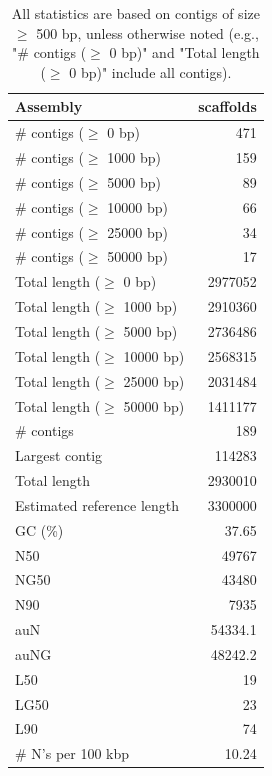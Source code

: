\documentclass[12pt,a4paper]{article}
\begin{document}
\begin{table}[ht]
\begin{center}
\caption{All statistics are based on contigs of size $\geq$ 500 bp, unless otherwise noted (e.g., "\# contigs ($\geq$ 0 bp)" and "Total length ($\geq$ 0 bp)" include all contigs).}
\begin{tabular}{|l*{1}{|r}|}
\hline
Assembly & scaffolds \\ \hline
\# contigs ($\geq$ 0 bp) & 471 \\ \hline
\# contigs ($\geq$ 1000 bp) & 159 \\ \hline
\# contigs ($\geq$ 5000 bp) & 89 \\ \hline
\# contigs ($\geq$ 10000 bp) & 66 \\ \hline
\# contigs ($\geq$ 25000 bp) & 34 \\ \hline
\# contigs ($\geq$ 50000 bp) & 17 \\ \hline
Total length ($\geq$ 0 bp) & 2977052 \\ \hline
Total length ($\geq$ 1000 bp) & 2910360 \\ \hline
Total length ($\geq$ 5000 bp) & 2736486 \\ \hline
Total length ($\geq$ 10000 bp) & 2568315 \\ \hline
Total length ($\geq$ 25000 bp) & 2031484 \\ \hline
Total length ($\geq$ 50000 bp) & 1411177 \\ \hline
\# contigs & 189 \\ \hline
Largest contig & 114283 \\ \hline
Total length & 2930010 \\ \hline
Estimated reference length & 3300000 \\ \hline
GC (\%) & 37.65 \\ \hline
N50 & 49767 \\ \hline
NG50 & 43480 \\ \hline
N90 & 7935 \\ \hline
auN & 54334.1 \\ \hline
auNG & 48242.2 \\ \hline
L50 & 19 \\ \hline
LG50 & 23 \\ \hline
L90 & 74 \\ \hline
\# N's per 100 kbp & 10.24 \\ \hline
\end{tabular}
\end{center}
\end{table}
\end{document}
